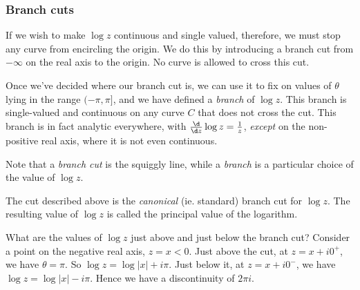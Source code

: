 \documentclass[a4paper]{article}
\begin{document}
\subsubsection*{Branch cuts}
If we wish to make $\log z$ continuous and single valued, therefore, we must stop any curve from encircling the origin. We do this by introducing a branch cut from $-\infty$ on the real axis to the origin. No curve is allowed to cross this cut.
\begin{center}
\end{center}
Once we've decided where our branch cut is, we can use it to fix on values of $\theta$ lying in the range $(-\pi, \pi]$, and we have defined a \emph{branch} of $\log z$. This branch is single-valued and continuous on any curve $C$ that does not cross the cut. This branch is in fact analytic everywhere, with $\frac{\d}{\d z} \log z = \frac{1}{z}$, \emph{except} on the non-positive real axis, where it is not even continuous.

Note that a \emph{branch cut} is the squiggly line, while a \emph{branch} is a particular choice of the value of $\log z$.

The cut described above is the \emph{canonical} (ie. standard) branch cut for $\log z$. The resulting value of $\log z$ is called the principal value of the logarithm.

What are the values of $\log z$ just above and just below the branch cut? Consider a point on the negative real axis, $z = x < 0$. Just above the cut, at $z = x + i 0^+$, we have $\theta = \pi$. So $\log z = \log |x| + i \pi$. Just below it, at $z = x + i0^-$, we have $\log z = \log |x| - i \pi$. Hence we have a discontinuity of $2\pi i$.
\end{document}
